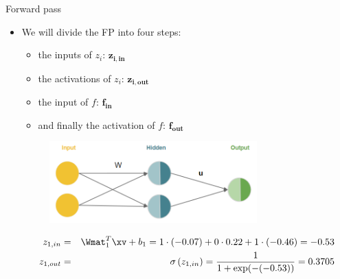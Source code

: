 \begin{vbframe}{ Forward pass}

\begin{itemize}
\item We will divide the FP into four steps:
\begin{itemize}
\item the inputs of $z_i$: $\bm{{z_{i,in}}}$
\item the activations of $z_i$: $\bm{{z_{i,out}}}$
\item the input of $f$: $\bm{{f_{in}}}$
\item and finally the activation of $f$: $\bm{{f_{out}}}$
\end{itemize}
\begin{figure}
\centering
\includegraphics[width=8cm]{figure/xor_rep.png}
\end{figure}
\begin{figure}
\centering
{}
\end{figure}
\begin{footnotesize}
\begin{eqnarray*}
z_{1,in} &=& \Wmat_1^T \xv + b_1 =  1 \cdot (-0.07) + 0 \cdot 0.22 + 1 \cdot (-0.46) = -0.53 \\
z_{1,out} &=& \sigma\left(z_{1,in}\right) = \frac{1}{1+\exp(-(-0.53))} = \num[round-mode=places,round-precision=4]{0.3705169}
\end{eqnarray*}
\end{footnotesize}
\end{itemize}
\framebreak


\end{vbframe}
